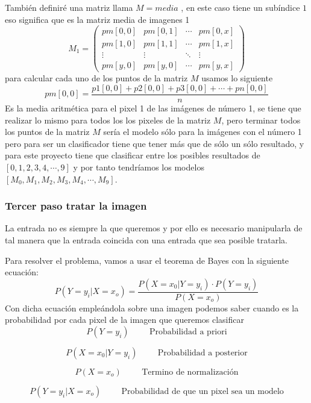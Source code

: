 \documentclass[
  spanish,
]{article}
\begin{document}
También definiré una matriz llama \(M=media\) , en este caso tiene un
subíndice \(1\) eso significa que es la matriz media de imagenes 1 \[
M_1=
\begin{pmatrix}
pm[0,0] & pm[0,1] & \cdots & pm[0,x]\\
pm[1,0] & pm[1,1] & \cdots & pm[1,x]\\
\vdots & \vdots & \ddots & \vdots\\
pm[y,0] & pm[y,0] & \cdots & pm[y,x]
\end{pmatrix}
\] para calcular cada uno de los puntos de la matriz \(M\) usamos lo
siguiente \[
pm[0,0]= \frac{p1[0,0]+ p2[0,0] + p3[0,0]+ \cdots + pn[0,0]}{n}
\] Es la media aritmética para el pixel 1 de las imágenes de número 1,
se tiene que realizar lo mismo para todos los los pixeles de la matriz
\(M\), pero terminar todos los puntos de la matriz \(M\) sería el modelo
sólo para la imágenes con el número 1 pero para ser un clasificador
tiene que tener más que de sólo un sólo resultado, y para este proyecto
tiene que clasificar entre los posibles resultados de
\([0,1,2,3,4,\cdots,9]\) y por tanto tendríamos los modelos
\([M_0,M_1,M_2,M_3,M_4,\cdots,M_9]\).

\hypertarget{tercer-paso-tratar-la-imagen}{%
\subsubsection{Tercer paso tratar la
imagen}\label{tercer-paso-tratar-la-imagen}}

La entrada no es siempre la que queremos y por ello es necesario
manipularla de tal manera que la entrada coincida con una entrada que
sea posible tratarla.

Para resolver el problema, vamos a usar el teorema de Bayes con la
siguiente ecuación: \[
P(Y=y_i|X=x_o)= \frac{P(X=x_0| Y=y_i)\cdot P(Y=y_i)}{P(X=x_o)}
\] Con dicha ecuación empleándola sobre una imagen podemos saber cuando
es la probabilidad por cada pixel de la imagen que queremos clasificar
\[
P(Y=y_i) \hspace{1cm} \text{Probabilidad a priori}
\]

\[
P(X=x_0| Y=y_i) \hspace{1cm} \text{Probabilidad a posterior}
\]

\[
P(X=x_o) \hspace{1cm} \text{Termino de normalización}
\]

\[
P(Y=y_i|X=x_o)  \hspace{1cm} \text{Probabilidad  de que un pixel sea un modelo}
\]
\end{document}
